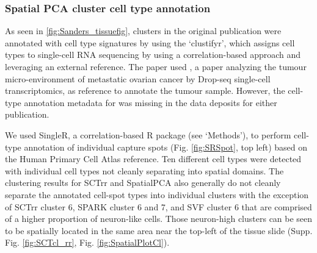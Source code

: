 \documentclass{article}
\begin{document}
\subsubsection*{Spatial PCA cluster cell type annotation}

As seen in \ref{fig:Sanders_tissuefig}, clusters in the original publication were annotated with cell type signatures by using the `clustifyr'\citep{fu_clustifyr_2020}, which assigns cell types to single-cell RNA sequencing by using a correlation-based approach and leveraging an external reference. The \citet{sanders_small_2022} paper used \citet{olalekan_characterizing_2021}, a paper analyzing the tumour micro-environment of metastatic ovarian cancer by Drop-seq single-cell transcriptomics, as reference to annotate the tumour sample. However, the cell-type annotation metadata for \citet{olalekan_characterizing_2021} was missing in the data deposits for either publication.

We used SingleR\citep{aran_referencebased_2019}, a correlation-based R package (see `Methods'), to perform cell-type annotation of individual capture spots (Fig. \ref{fig:SRSpot}, top left) based on the Human Primary Cell Atlas\citep{mabbott_expression_2013} reference. Ten different cell types were detected with individual cell types not cleanly separating into spatial domains. The clustering results for SCTrr and SpatialPCA also generally do not cleanly separate the annotated cell-spot types into individual clusters with the exception of SCTrr cluster 6, SPARK cluster 6 and 7, and SVF cluster 6 that are comprised of a higher proportion of neuron-like cells. Those neuron-high clusters can be seen to be spatially located in the same area near the top-left of the tissue slide (Supp. Fig. \ref{fig:SCTcl_rr}, Fig. \ref{fig:SpatialPlotCl}). 
\end{document}
